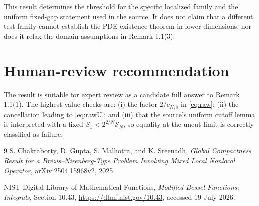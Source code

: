 \documentclass[11pt]{article}
\newcommand{\SN}{\mathcal{S}_N}
\begin{document}
This result determines the threshold for the specific localized family and
the uniform fixed-gap statement used in the source. It does not claim that a
different test family cannot establish the PDE existence theorem in lower
dimensions, nor does it relax the domain assumptions in Remark 1.1(3).

\section{Human-review recommendation}

The result is suitable for expert review as a candidate full answer to Remark
1.1(1). The highest-value checks are: (i) the factor $2/c_{N,s}$ in
\eqref{eq:raw}; (ii) the cancellation leading to \eqref{eq:rawU}; and (iii)
that the source's uniform cutoff lemma is interpreted with a fixed
$S_1<2^{2/N}\SN$, so equality at the uncut limit is correctly classified as
failure.

\begin{thebibliography}{9}
S. Chakraborty, D. Gupta, S. Malhotra, and K. Sreenadh,
\emph{Global Compactness Result for a Br\'ezis--Nirenberg-Type Problem
Involving Mixed Local Nonlocal Operator}, arXiv:2504.15968v2, 2025.

NIST Digital Library of Mathematical Functions,
\emph{Modified Bessel Functions: Integrals}, Section 10.43,
\url{https://dlmf.nist.gov/10.43}, accessed 19 July 2026.
\end{thebibliography}
\end{document}
